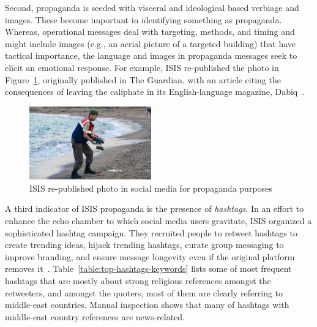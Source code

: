 \documentclass[letterpaper]{article}
\begin{document}
Second, propaganda is seeded with visceral and ideological based verbiage and images. These become important in identifying something as propaganda. Whereas, operational messages deal with targeting, methods, and timing and might include images (e.g., an aerial picture of a targeted building) that have tactical importance, the language and images in propaganda messages seek to elicit an emotional response. For example, ISIS re-published the photo in Figure~\ref{fig:drowned-syrian-boy}, originally published in The Guardian, with an article citing the consequences of leaving the caliphate in its English-language magazine, Dabiq~\cite{theguardian}.

\begin{figure}[ht]
\includegraphics[width=0.47\textwidth]{img/drowned-syrian-boy.jpeg}
\caption{ISIS re-published photo in social media for propaganda purposes}
\label{fig:drowned-syrian-boy}
\end{figure}

A third indicator of ISIS propaganda is the presence of \textit{hashtags}. In an effort to enhance the echo chamber to which social media users gravitate, ISIS organized a sophisticated hashtag campaign. They recruited people to retweet hashtags to create trending ideas, hijack trending hashtags, curate group messaging to improve branding, and ensure message longevity even if the original platform removes it~\cite{telegram-to-twitter}. Table~\ref{table:top-hashtags-keywords} lists some of most frequent hashtags that are mostly about strong religious references amongst the retweeters, and amongst the quoters, most of them are clearly referring to middle-east countries. Manual inspection shows that many of hashtags with middle-east country references are news-related.
\end{document}
